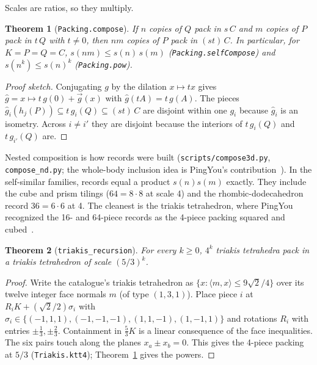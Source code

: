 \documentclass[11pt,a4paper]{article}
\newcommand{\code}[1]{\texttt{\nolinkurl{#1}}}
\newcommand{\lean}[1]{\texttt{#1}}
\newtheorem{theorem}{Theorem}
\theoremstyle{definition}
\theoremstyle{remark}
\begin{document}
Scales are ratios, so they multiply.

\begin{theorem}[\lean{Packing.compose}]\label{thm:compose}
If $n$ copies of $Q$ pack in $s\,C$ and $m$ copies of $P$ pack in $t\,Q$ with $t\ne 0$, then $nm$ copies of $P$ pack in $(st)\,C$. In particular, for $K=P=Q=C$, $s(nm)\le s(n)\,s(m)$ (\lean{Packing.selfCompose}) and $s(n^k)\le s(n)^k$ (\lean{Packing.pow}).
\end{theorem}

\begin{proof}[Proof sketch]
Conjugating $g$ by the dilation $x\mapsto tx$ gives $\hat g=x\mapsto t\,g(0)+\vec g(x)$ with $\hat g(tA)=t\,g(A)$. The pieces $\hat g_i(h_j(P))\subseteq t\,g_i(Q)\subseteq (st)\,C$ are disjoint within one $g_i$ because $\hat g_i$ is an isometry. Across $i\ne i'$ they are disjoint because the interiors of $t\,g_i(Q)$ and $t\,g_{i'}(Q)$ are.
\end{proof}

Nested composition is how \nNested{} records were built (\code{scripts/compose3d.py}, \code{compose\_nd.py}; the whole-body inclusion idea is PingYou's contribution~\cite{ping79}). In the self-similar families, \nComposites{} records equal a product $s(n)s(m)$ exactly. They include the cube and prism tilings ($64=8\cdot 8$ at scale 4) and the rhombic-dodecahedron record $36=6\cdot6$ at 4. The cleanest is the triakis tetrahedron, where PingYou recognized the 16- and 64-piece records as the 4-piece packing squared and cubed~\cite{pingSixteen}.

\begin{theorem}[\lean{triakis\_recursion}]\label{thm:triakis}
For every $k\ge0$, $4^k$ triakis tetrahedra pack in a triakis tetrahedron of scale $(5/3)^k$.
\end{theorem}

\begin{proof}
Write the catalogue's triakis tetrahedron as $\{x:\langle m,x\rangle\le 9\sqrt2/4\}$ over its twelve integer face normals $m$ (of type $(1,3,1)$). Place piece $i$ at $R_iK+(\sqrt2/2)\sigma_i$ with $\sigma_i\in\{(-1,1,1),(-1,-1,-1),(1,1,-1),(1,-1,1)\}$ and rotations $R_i$ with entries $\pm\frac13,\pm\frac23$. Containment in $\frac53K$ is a linear consequence of the face inequalities. The six pairs touch along the planes $x_a\pm x_b=0$. This gives the 4-piece packing at $5/3$ (\lean{Triakis.ktt4}); Theorem~\ref{thm:compose} gives the powers.
\end{proof}
\end{document}

